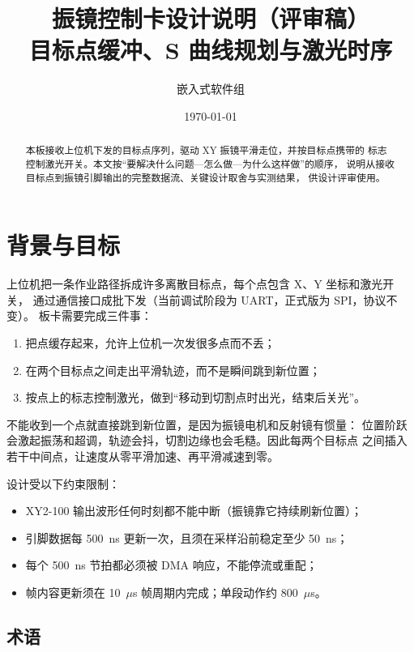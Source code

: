 \documentclass[UTF8,a4paper,11pt]{ctexart}
\title{振镜控制卡设计说明（评审稿）\\[2pt]
\large 目标点缓冲、S 曲线规划与激光时序}
\author{嵌入式软件组}
\date{\today}
\begin{document}
\maketitle

\begin{abstract}
\noindent
本板接收上位机下发的目标点序列，驱动 XY 振镜平滑走位，并按目标点携带的
标志控制激光开关。本文按“要解决什么问题—怎么做—为什么这样做”的顺序，
说明从接收目标点到振镜引脚输出的完整数据流、关键设计取舍与实测结果，
供设计评审使用。
\end{abstract}

\section{背景与目标}

上位机把一条作业路径拆成许多离散目标点，每个点包含 X、Y 坐标和激光开关，
通过通信接口成批下发（当前调试阶段为 UART，正式版为 SPI，协议不变）。
板卡需要完成三件事：

\begin{enumerate}
  \item 把点缓存起来，允许上位机一次发很多点而不丢；
  \item 在两个目标点之间走出平滑轨迹，而不是瞬间跳到新位置；
  \item 按点上的标志控制激光，做到“移动到切割点时出光，结束后关光”。
\end{enumerate}

不能收到一个点就直接跳到新位置，是因为振镜电机和反射镜有惯量：
位置阶跃会激起振荡和超调，轨迹会抖，切割边缘也会毛糙。因此每两个目标点
之间插入若干中间点，让速度从零平滑加速、再平滑减速到零。

设计受以下约束限制：

\begin{itemize}
  \item XY2-100 输出波形任何时刻都不能中断（振镜靠它持续刷新位置）；
  \item 引脚数据每 500~ns 更新一次，且须在采样沿前稳定至少 50~ns；
  \item 每个 500~ns 节拍都必须被 DMA 响应，不能停流或重配；
  \item 帧内容更新须在 10~$\mu$s 帧周期内完成；单段动作约 800~$\mu$s。
\end{itemize}

\subsection*{术语}
\end{document}
